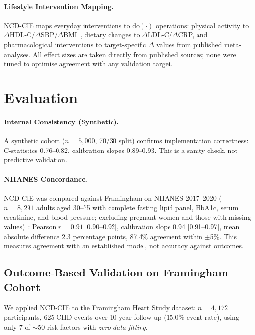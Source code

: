 \documentclass[runningheads]{llncs}
\begin{document}
\paragraph{Lifestyle Intervention Mapping.}
NCD-CIE maps everyday interventions to $\mathrm{do}(\cdot)$
operations: physical activity to $\Delta$HDL-C/$\Delta$SBP/$\Delta$BMI~\cite{naci2018comparative},
dietary changes to $\Delta$LDL-C/$\Delta$CRP, and
pharmacological interventions to target-specific $\Delta$ values
from published meta-analyses.
All effect sizes are taken directly from published sources;
none were tuned to optimise agreement with any validation target.

\section{Evaluation}\label{sec:validation}

\paragraph{Internal Consistency (Synthetic).}
A synthetic cohort ($n = 5{,}000$, 70/30 split) confirms
implementation correctness: C-statistics 0.76--0.82, calibration
slopes 0.89--0.93.
This is a sanity check, not predictive validation.

\paragraph{NHANES Concordance.}
NCD-CIE was compared against Framingham on NHANES 2017--2020
($n = 8{,}291$ adults aged 30--75 with complete fasting lipid panel,
HbA1c, serum creatinine, and blood pressure; excluding pregnant
women and those with missing values)~\cite{nhanes2020}:
Pearson $r = 0.91$ [0.90--0.92],
calibration slope 0.94 [0.91--0.97], mean absolute difference
2.3 percentage points, 87.4\% agreement within $\pm$5\%.
This measures agreement with an established model, not accuracy
against outcomes.

\subsection{Outcome-Based Validation on Framingham Cohort}\label{sec:framingham}

We applied NCD-CIE to the Framingham Heart Study dataset:
$n = 4{,}172$ participants, 625 CHD events over 10-year follow-up
(15.0\% event rate), using only 7 of ${\sim}$50 risk factors
with \emph{zero data fitting}.
\end{document}
